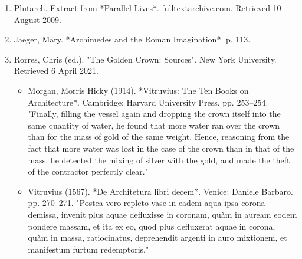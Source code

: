 \begin{enumerate}
\item Plutarch. Extract from *Parallel Lives*. fulltextarchive.com. Retrieved 10 August 2009.
\item Jaeger, Mary. *Archimedes and the Roman Imagination*. p. 113.
\item Rorres, Chris (ed.). "The Golden Crown: Sources". New York University. Retrieved 6 April 2021.
\begin{itemize}
\item Morgan, Morris Hicky (1914). *Vitruvius: The Ten Books on Architecture*. Cambridge: Harvard University Press. pp. 253–254. "Finally, filling the vessel again and dropping the crown itself into the same quantity of water, he found that more water ran over the crown than for the mass of gold of the same weight. Hence, reasoning from the fact that more water was lost in the case of the crown than in that of the mass, he detected the mixing of silver with the gold, and made the theft of the contractor perfectly clear."
\item Vitruvius (1567). *De Architetura libri decem*. Venice: Daniele Barbaro. pp. 270–271. "Postea vero repleto vase in eadem aqua ipsa corona demissa, invenit plus aquae defluxisse in coronam, quàm in auream eodem pondere massam, et ita ex eo, quod plus defluxerat aquae in corona, quàm in massa, ratiocinatus, deprehendit argenti in auro mixtionem, et manifestum furtum redemptoris."
\end{itemize}
\end{enumerate}
